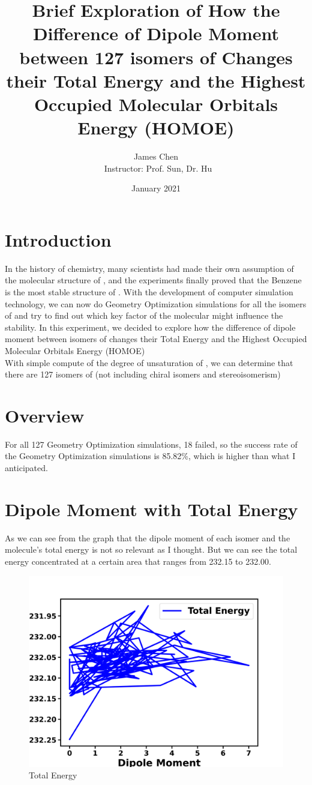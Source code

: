 \documentclass{article}
\title{Brief Exploration of How the Difference of Dipole Moment between 127 isomers of \ce{C6H6} Changes their Total Energy and the Highest Occupied Molecular Orbitals Energy (HOMOE) }
\author{James Chen \\ \ Instructor: Prof. Sun, Dr. Hu}
\date{January 2021}
\begin{document}
\maketitle

\section{Introduction}
In the history of chemistry, many scientists had made their own assumption of the molecular structure of , and the experiments finally proved that the Benzene is the most stable structure of . With the development of computer simulation technology, we can now do Geometry Optimization simulations for all the isomers of  and try to find out which key factor of the molecular might influence the stability. In this experiment, we decided to explore how the difference of dipole moment between isomers of  changes their Total Energy and the Highest Occupied Molecular Orbitals Energy (HOMOE) \\ With simple compute of the degree of unsaturation of , we can determine that there are 127 isomers of  (not including chiral isomers and stereoisomerism)



\section{Overview}
For all 127 Geometry Optimization simulations, 18 failed, so the success rate of the Geometry Optimization simulations is 85.82\%, which is higher than what I anticipated. 


\section{Dipole Moment with Total Energy}
As we can see from the graph that the dipole moment of each isomer and the molecule's total energy is not so relevant as I thought. But we can see the total energy concentrated at a certain area that ranges from 232.15 to 232.00.
\begin{figure}[H]
\centering
\includegraphics[scale=0.5]{Total Energy.png}
\caption{Total Energy}
\label{fig:universe}
\end{figure}
\end{document}
